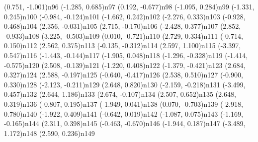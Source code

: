 \pnode(0.751, -1.001){n96}
\pnode(-1.285, 0.685){n97}
\pnode(0.192, -0.677){n98}
\pnode(-1.095, 0.284){n99}
\pnode(-1.331, 0.245){n100}
\pnode(-0.984, -0.124){n101}
\pnode(-1.662, 0.242){n102}
\pnode(-2.276, 0.333){n103}
\pnode(-0.928, 0.468){n104}
\pnode(2.356, -0.031){n105}
\pnode(2.715, -0.170){n106}
\pnode(-2.428, 0.377){n107}
\pnode(2.852, -0.933){n108}
\pnode(3.225, -0.503){n109}
\pnode(0.010, -0.721){n110}
\pnode(2.729, 0.334){n111}
\pnode(-0.714, 0.150){n112}
\pnode(2.562, 0.375){n113}
\pnode(-0.135, -0.312){n114}
\pnode(2.597, 1.100){n115}
\pnode(-3.397, 0.547){n116}
\pnode(-1.443, -0.144){n117}
\pnode(-1.905, 0.048){n118}
\pnode(-1.296, -0.328){n119}
\pnode(-1.414, -0.575){n120}
\pnode(2.508, -0.139){n121}
\pnode(-1.220, 0.408){n122}
\pnode(-1.379, -0.421){n123}
\pnode(2.684, 0.327){n124}
\pnode(2.588, -0.197){n125}
\pnode(-0.640, -0.417){n126}
\pnode(2.538, 0.510){n127}
\pnode(-0.900, 0.330){n128}
\pnode(-2.123, -0.211){n129}
\pnode(2.648, 0.820){n130}
\pnode(-2.159, -0.218){n131}
\pnode(-3.499, 0.457){n132}
\pnode(2.644, 1.186){n133}
\pnode(2.674, -0.107){n134}
\pnode(2.507, 0.652){n135}
\pnode(2.648, 0.319){n136}
\pnode(-0.807, 0.195){n137}
\pnode(-1.949, 0.041){n138}
\pnode(0.070, -0.703){n139}
\pnode(-2.918, 0.780){n140}
\pnode(-1.922, 0.409){n141}
\pnode(-0.642, 0.019){n142}
\pnode(-1.087, 0.075){n143}
\pnode(-1.169, -0.165){n144}
\pnode(2.311, 0.398){n145}
\pnode(-0.463, -0.670){n146}
\pnode(-1.944, 0.187){n147}
\pnode(-3.489, 1.172){n148}
\pnode(2.590, 0.236){n149}
